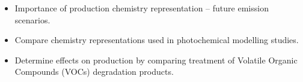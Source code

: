 \begin{BlueBox}
    \vskip-1cm
    \begin{block}{}
        \begin{itemize}
            \item Importance of  production chemistry representation -- future emission scenarios. \vspace{5mm}
            \item Compare  chemistry representations used in photochemical modelling studies. \vspace{5mm}
            \item Determine effects on  production by comparing treatment of Volatile Organic Compounds (VOCs) degradation products. 
        \end{itemize}
    \end{block}
\end{BlueBox}
